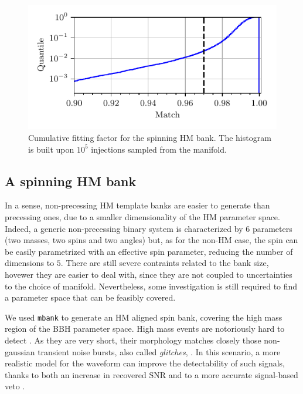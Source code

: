 \documentclass[twocolumn,showpacs,preprintnumbers,nofootinbib,prd,
superscriptaddress,10pt]{revtex4-2}
\begin{document}
\begin{figure}[t]
	\centering
	\includegraphics[scale = 1.]{HM_hist}
	\caption{Cumulative fitting factor for the spinning HM bank. The histogram is built upon $10^5$ injections sampled from the manifold.}
	\label{fig:HM_hist}
\end{figure}


\subsection{A spinning HM bank} \label{sec:HM_spinning_bank}

In a sense, non-precessing HM template banks are easier to generate than precessing ones, due to a smaller dimensionality of the HM parameter space. Indeed, a generic non-precessing binary system is characterized by $6$ parameters (two masses, two spins and two angles) but, as for the non-HM case, the spin can be easily parametrized with an effective spin parameter, reducing the number of dimensions to $5$.
There are still severe contraints related to the bank size, hovewer they are easier to deal with, since they are not coupled to uncertainties to the choice of manifold.
Nevertheless, some investigation is still required to find a parameter space that can be feasibly covered.

We used \texttt{mbank} to generate an HM aligned spin bank, covering the high mass region of the BBH parameter space.
High mass events are notoriously hard to detect \cite{LIGOScientific:2021tfm, Chandra:2021wbw}. As they are very short, their morphology matches closely those non-gaussian transient noise bursts, also called {\it glitches}, \cite{Blackburn:2008ah, Zevin:2016qwy, LIGOScientific:2016gtq}. In this scenario, a more realistic model for the waveform can improve the detectability of such signals, thanks to both an increase in recovered SNR and to a more accurate signal-based veto \cite{Babak:2005kv, PhysRevD.95.042001}.
\end{document}
